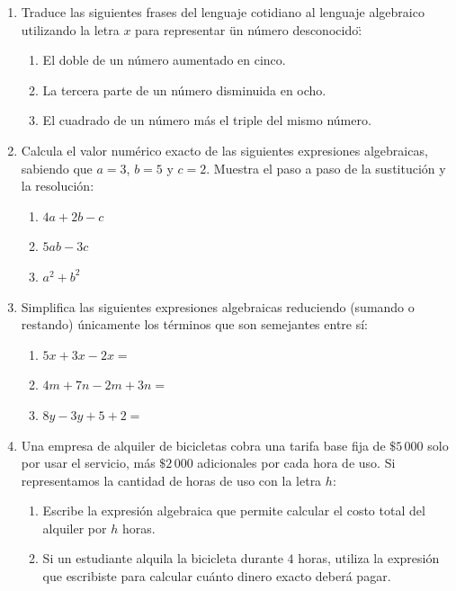 \documentclass[12pt, letterpaper]{article}
\begin{document}
	\begin{enumerate}[itemsep=0.8cm]
		
		\item Traduce las siguientes frases del lenguaje cotidiano al lenguaje algebraico utilizando la letra $x$ para representar \"un número desconocido\":
		\begin{enumerate}[label=\alph*., itemsep=0.3cm, topsep=0.2cm]
			\item El doble de un número aumentado en cinco.
			\item La tercera parte de un número disminuida en ocho.
			\item El cuadrado de un número más el triple del mismo número.
		\end{enumerate}
		
		\item Calcula el valor numérico exacto de las siguientes expresiones algebraicas, sabiendo que $a = 3$, $b = 5$ y $c = 2$. Muestra el paso a paso de la sustitución y la resolución:
		\begin{enumerate}[label=\alph*., itemsep=0.3cm, topsep=0.2cm]
			\item $4a + 2b - c$
			\item $5ab - 3c$
			\item $a^2 + b^2$
		\end{enumerate}
		
		\item Simplifica las siguientes expresiones algebraicas reduciendo (sumando o restando) únicamente los términos que son semejantes entre sí:
		\begin{enumerate}[label=\alph*., itemsep=0.3cm, topsep=0.2cm]
			\item $5x + 3x - 2x =$
			\item $4m + 7n - 2m + 3n =$
			\item $8y - 3y + 5 + 2 =$
		\end{enumerate}
		
		\item Una empresa de alquiler de bicicletas cobra una tarifa base fija de $\$5\,000$ solo por usar el servicio, más $\$2\,000$ adicionales por cada hora de uso. Si representamos la cantidad de horas de uso con la letra $h$:
		\begin{enumerate}[label=\alph*., itemsep=0.2cm, topsep=0.2cm]
			\item Escribe la expresión algebraica que permite calcular el costo total del alquiler por $h$ horas.
			\item Si un estudiante alquila la bicicleta durante $4$ horas, utiliza la expresión que escribiste para calcular cuánto dinero exacto deberá pagar.
		\end{enumerate}
		

\end{enumerate}
\end{document}

